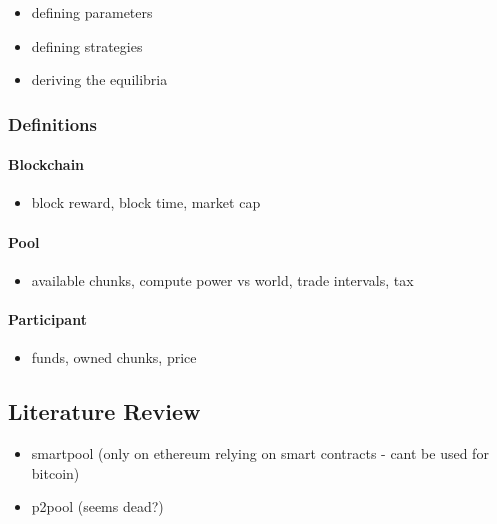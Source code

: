 \begin{itemize}
  \item defining parameters
  \item defining strategies
  \item deriving the equilibria
\end{itemize}

\subsubsection{Definitions}

\paragraph{Blockchain}

\begin{itemize}
  \item block reward, block time, market cap
\end{itemize}


\paragraph{Pool}

\begin{itemize}
  \item available chunks, compute power vs world, trade intervals, tax
\end{itemize}

\paragraph{Participant}

\begin{itemize}
  \item funds, owned chunks, price
\end{itemize}

\subsection{Literature Review} %

\begin{itemize}
  \item smartpool (only on ethereum relying on smart contracts - cant be used for bitcoin)
  \item p2pool (seems dead?)
\end{itemize}